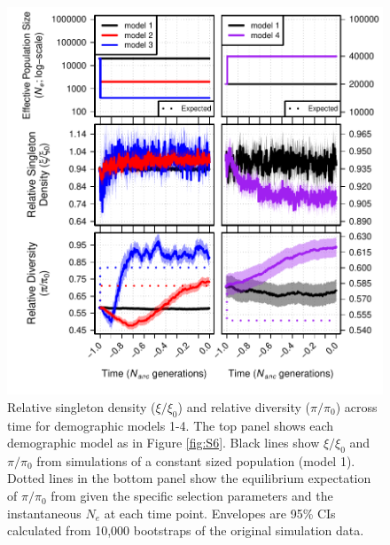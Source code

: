 \documentclass[9pt,twocolumn,twoside]{rilabRxiv}
\begin{document}
\begin{figure}[]
\includegraphics[width=\linewidth]{figures/F1newclean_2.pdf}
\caption{Relative singleton density ($\xi/\xi_0$) and relative diversity ($\pi/\pi_0$) across time for demographic models 1-4.
The top panel shows each demographic model as in Figure \ref{fig:S6}.
Black lines show $\xi/\xi_0$ and $\pi/\pi_0$ from simulations of a constant sized population (model 1).
Dotted lines in the bottom panel show the equilibrium  expectation of $\pi/\pi_0$ from  \citet{nordborg1996effect} given the specific selection parameters and the instantaneous $N_e$ at each time point.
Envelopes are 95\% CIs calculated from 10,000 bootstraps of the original simulation data.}
\label{fig:1}
\end{figure}
\end{document}
